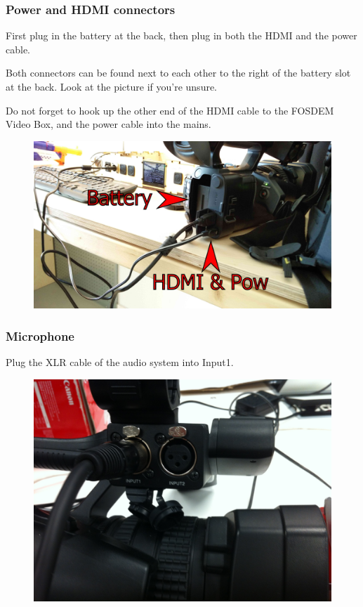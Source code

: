 \documentclass{article}
\begin{document}
\subsubsection{Power and HDMI connectors}
First plug in the battery at the back, then plug in both the HDMI and the power cable.

Both connectors can be found next to each other to the right of the battery slot at the back.
Look at the picture if you're unsure.

Do not forget to hook up the other end of the HDMI cable to the FOSDEM Video Box, and the power cable into the mains.

\begin{figure}[H]
  \centering
\includegraphics[width = 120mm]{Sony01.jpg}
\end{figure}

\subsubsection{Microphone}
Plug the XLR cable of the audio system into Input1.

\begin{figure}[H]
  \centering
\includegraphics[width = 120mm]{sony_connect_xlr.jpg}
\end{figure}
\end{document}
